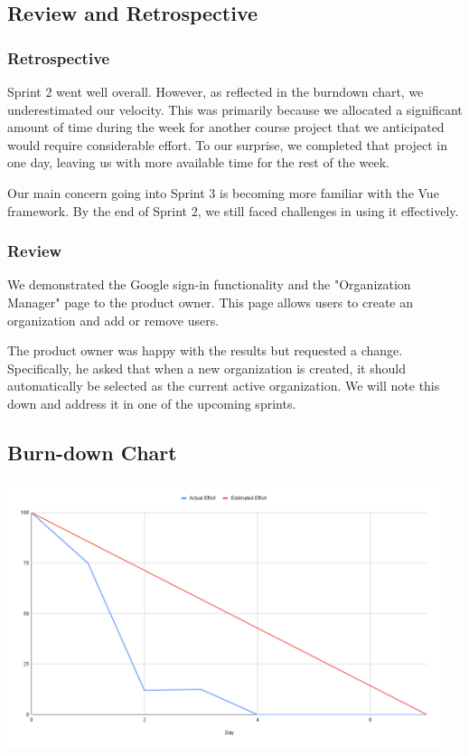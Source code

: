 \documentclass{article}
\begin{document}
\subsection{Review and Retrospective}

\subsubsection{Retrospective}
Sprint 2 went well overall. However, as reflected in the burndown chart, we underestimated our velocity. This was primarily because we allocated a significant amount of time during the week for another course project that we anticipated would require considerable effort. To our surprise, we completed that project in one day, leaving us with more available time for the rest of the week.

Our main concern going into Sprint 3 is becoming more familiar with the Vue framework. By the end of Sprint 2, we still faced challenges in using it effectively.

\subsubsection{Review}
We demonstrated the Google sign-in functionality and the "Organization Manager" page to the product owner. This page allows users to create an organization and add or remove users.

The product owner was happy with the results but requested a change. Specifically, he asked that when a new organization is created, it should automatically be selected as the current active organization. We will note this down and address it in one of the upcoming sprints.
\subsection{Burn-down Chart}
\includegraphics[width=0.95\textwidth]{images/burndown_chart_2.png}
\end{document}
